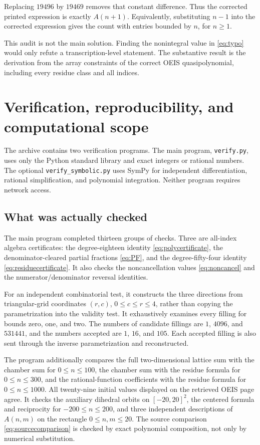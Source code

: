 \documentclass[11pt]{article}
\numberwithin{equation}{section}
\theoremstyle{definition}
\begin{document}
Replacing $19496$ by $19469$ removes that constant difference. Thus the
corrected printed expression is exactly $A(n+1)$. Equivalently, substituting
$n-1$ into the corrected expression gives the count with entries bounded by
$n$, for $n\geq1$.

This audit is not the main solution. Finding the nonintegral value in
\eqref{eq:typo} would only refute a transcription-level statement. The
substantive result is the derivation from the array constraints of the
correct OEIS quasipolynomial, including every residue class and all indices.

\section{Verification, reproducibility, and computational scope}
\label{sec:verification}

The archive contains two verification programs. The main program,
\texttt{verify.py}, uses only the Python standard library and exact integers
or rational numbers. The optional \texttt{verify\_symbolic.py} uses SymPy for
independent differentiation, rational simplification, and polynomial
integration. Neither program requires network access.

\subsection{What was actually checked}
The main program completed thirteen groups of checks. Three are all-index
algebra certificates: the degree-eighteen identity
\eqref{eq:polycertificate}, the denominator-cleared partial fractions
\eqref{eq:PF}, and the degree-fifty-four identity
\eqref{eq:residuecertificate}. It also checks the noncancellation values
\eqref{eq:noncancel} and the numerator/denominator reversal identities.

For an independent combinatorial test, it constructs the three directions
from triangular-grid coordinates $(r,c)$, $0\leq c\leq r\leq4$, rather
than copying the parametrization into the validity test. It exhaustively
examines every filling for bounds zero, one, and two. The numbers of candidate
fillings are $1$, $4096$, and $531441$, and the numbers accepted are $1$,
$16$, and $105$. Each accepted filling is also sent through the inverse
parametrization and reconstructed.

The program additionally compares the full two-dimensional lattice sum with
the chamber sum for $0\leq n\leq100$, the chamber sum with the residue
formula for $0\leq n\leq300$, and the rational-function coefficients with
the residue formula for $0\leq n\leq1000$. All twenty-nine initial values
displayed on the retrieved OEIS page agree. It checks the auxiliary dihedral
orbits on $[-20,20]^2$, the centered formula and reciprocity for
$-200\leq n\leq200$, and three independent descriptions of $A(n,m)$ on
the rectangle $0\leq n,m\leq20$. The source comparison
\eqref{eq:sourcecomparison} is checked by exact polynomial composition,
not only by numerical substitution.
\end{document}
